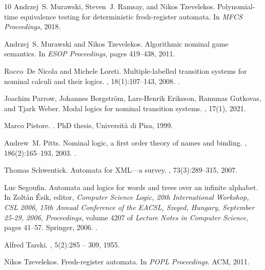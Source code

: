 \documentclass[10pt,a4paper]{article}
\theoremstyle{definition}
\theoremstyle{remark}
\begin{document}
\begin{thebibliography}{10}
Andrzej~S. Murawski, Steven~J. Ramsay, and Nikos Tzevelekos.
\newblock Polynomial-time equivalence testing for deterministic fresh-register
  automata.
\newblock In {\em MFCS Proceedings}, 2018.

Andrzej~S. Murawski and Nikos Tzevelekos.
\newblock Algorithmic nominal game semantics.
\newblock In {\em ESOP Proceedings}, pages 419--438, 2011.

Rocco~De Nicola and Michele Loreti.
\newblock Multiple-labelled transition systems for nominal calculi and their
  logics.
, 18(1):107--143, 2008.
\newblock \href {https://doi.org/10.1017/S0960129507006585}
  {}.

Joachim Parrow, Johannes Borgstr{\"{o}}m, Lars{-}Henrik Eriksson, Ramunas
  Gutkovas, and Tjark Weber.
\newblock Modal logics for nominal transition systems.
, 17(1), 2021.

Marco Pistore.
.
\newblock PhD thesis, Universit\`a di Pisa, 1999.

Andrew~M. Pitts.
\newblock Nominal logic, a first order theory of names and binding.
, 186(2):165--193, 2003.
\newblock \href {https://doi.org/10.1016/S0890-5401(03)00138-X}
  {}.

Thomas Schwentick.
\newblock Automata for {XML}---a survey.
, 73(3):289--315, 2007.

Luc Segoufin.
\newblock Automata and logics for words and trees over an infinite alphabet.
\newblock In Zolt{\'{a}}n {\'{E}}sik, editor, {\em Computer Science Logic, 20th
  International Workshop, {CSL} 2006, 15th Annual Conference of the EACSL,
  Szeged, Hungary, September 25-29, 2006, Proceedings}, volume 4207 of {\em
  Lecture Notes in Computer Science}, pages 41--57. Springer, 2006.
\newblock \href {https://doi.org/10.1007/11874683\_3}
  {}.

Alfred Tarski.
, 5(2):285 -- 309, 1955.

Nikos Tzevelekos.
\newblock Fresh-register automata.
\newblock In {\em POPL Proceedings}. {ACM}, 2011.

\end{thebibliography}
\end{document}
